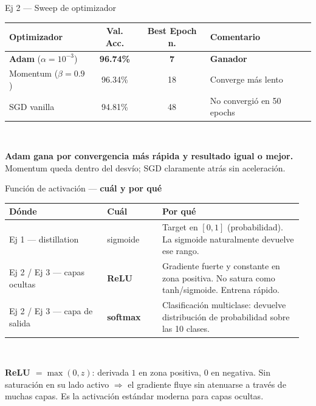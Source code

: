 \documentclass[11pt,aspectratio=169]{beamer}
\begin{document}
\begin{frame}{Ej 2 — Sweep de optimizador}
\centering\footnotesize
\begin{tabular}{@{}lccl@{}}
\toprule
\textbf{Optimizador} & \textbf{Val. Acc.} & \textbf{Best Epoch n.} & \textbf{Comentario} \\
\midrule
\rowcolor{accent2!15}
\textbf{Adam} ($\alpha=10^{-3}$)        & \textbf{96.74\%} & \textbf{7}  & \textbf{Ganador} \\
Momentum ($\beta = 0.9$)                 & 96.34\%          & 18          & Converge más lento \\
SGD vanilla                              & 94.81\%          & 48          & No convergió en 50 epochs \\
\bottomrule
\end{tabular}\\[0.8em]

\begin{takeaway}
\textbf{Adam gana por convergencia más rápida y resultado igual o mejor.} Momentum queda dentro del desvío; SGD claramente atrás sin aceleración.
\end{takeaway}
\end{frame}

\begin{frame}{Función de activación — \textbf{cuál y por qué}}
\small
\begin{tabular}{@{}p{0.32\linewidth}p{0.18\linewidth}p{0.46\linewidth}@{}}
\toprule
\textbf{Dónde} & \textbf{Cuál} & \textbf{Por qué} \\
\midrule
Ej 1 — distillation & sigmoide & Target en $[0,1]$ (probabilidad). La sigmoide naturalmente devuelve ese rango. \\
\rowcolor{accent2!10}
Ej 2 / Ej 3 — capas ocultas & \textbf{ReLU} & Gradiente fuerte y constante en zona positiva. No satura como tanh/sigmoide. Entrena rápido. \\
\rowcolor{accent2!10}
Ej 2 / Ej 3 — capa de salida & \textbf{softmax} & Clasificación multiclase: devuelve distribución de probabilidad sobre las 10 clases. \\
\bottomrule
\end{tabular}\\[0.6em]

\begin{takeaway}
\textbf{ReLU $= \max(0, z)$}: derivada $1$ en zona positiva, $0$ en negativa. Sin saturación en su lado activo $\Rightarrow$ el gradiente fluye sin atenuarse a través de muchas capas. Es la activación estándar moderna para capas ocultas.
\end{takeaway}
\end{frame}
\end{document}
